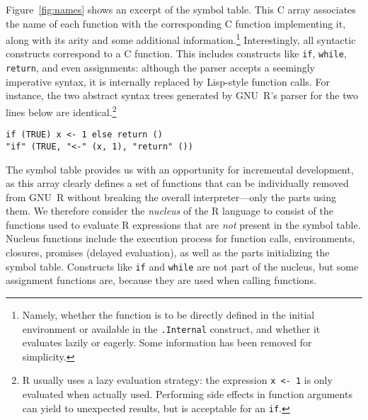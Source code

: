 \documentclass[
    sigplan,
    10pt,
    review, %
    natbib=false %
 ]{acmart}
\newcommand\mb[1]{\todo[color=purple!20,size=\scriptsize]{#1}}
\newcommand\et[1]{\todo[color=blue!20,size=\scriptsize]{#1}}
\begin{document}
Figure~\ref{fig:names} shows an excerpt of the symbol table.
This C array associates the name of each function with the corresponding C function implementing it, along with its arity and some additional information.\footnote{Namely, whether the function is to be directly defined in the initial environment or available in the \texttt{.Internal} construct, and whether it evaluates lazily or eagerly.
Some information has been removed for simplicity.}
Interestingly, all syntactic constructs correspond to a C function. This includes constructs like \texttt{if}, \texttt{while}, \texttt{return}, and even assignments:
although the parser accepts a seemingly imperative syntax, it is internally replaced by Lisp-style function calls.
For instance, the two abstract syntax trees generated
by GNU~R's parser for the two lines below are identical.\footnote{%
    R usually uses a lazy evaluation strategy:
    the expression \texttt{x <- 1} is only evaluated
    when actually used.
    Performing side effects in function arguments can yield to unexpected results,
    but is acceptable for an \texttt{if}.
}
\begin{verbatim}
if (TRUE) x <- 1 else return ()
"if" (TRUE, "<-" (x, 1), "return" ())
\end{verbatim}

The symbol table provides us with an opportunity for incremental development,
as this array clearly defines a set of functions that can be individually removed from GNU~R without breaking the overall interpreter---only the parts using them.
We therefore consider the {\em nucleus} of the R language to consist of the functions used to evaluate R expressions that are \emph{not} present in the symbol table.
Nucleus functions include the execution process for function calls, environments, closures, promises (delayed evaluation),
as well as the parts initializing the symbol table. Constructs like \texttt{if} and \texttt{while} are not part of the nucleus,
but some assignment functions are, because they are used when calling functions.
\end{document}
